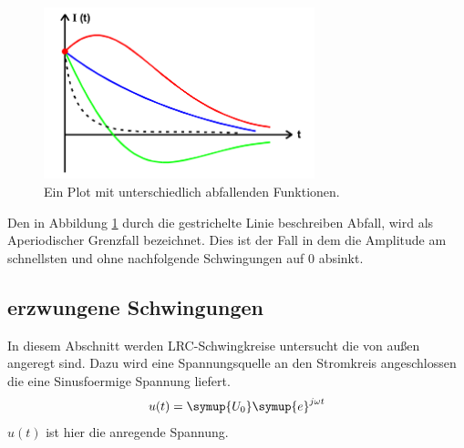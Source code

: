         \begin{figure}[H]
            \centering
            \includegraphics[width=0.7\textwidth]{images/AperiodischD.PNG}
            \caption{Ein Plot mit unterschiedlich abfallenden Funktionen.}
            \label{img:aperi}
        \end{figure}

        \noindent Den in Abbildung \ref{img:aperi} durch die gestrichelte Linie beschreiben Abfall, wird als Aperiodischer Grenzfall 
        bezeichnet. Dies ist der Fall in dem die Amplitude am schnellsten und ohne nachfolgende Schwingungen auf 0 absinkt.




    \subsection{erzwungene Schwingungen}
    
    \noindent In diesem Abschnitt werden LRC-Schwingkreise untersucht die von außen angeregt sind. Dazu wird eine Spannungsquelle an den Stromkreis 
    angeschlossen die eine Sinusfoermige Spannung liefert.
    \begin{equation}
        u(t)= \symup{U_0} \symup{e}^{j \omega t} \nonumber
    \end{equation}
    $u(t)$ ist hier die anregende Spannung.

